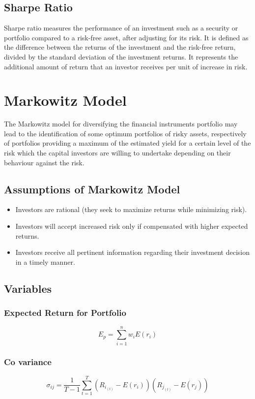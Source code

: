\documentclass[conference]{IEEEtran}
\begin{document}
\subsection{Sharpe Ratio}
    Sharpe ratio measures the performance of an investment such as a security or portfolio compared to a risk-free asset, after adjusting for its risk. It is defined as the difference between the returns of the investment and the risk-free return, divided by the standard deviation of the investment returns. It represents the additional amount of return that an investor receives per unit of increase in risk.
    

\section{Markowitz Model}
The Markowitz model for diversifying the financial instruments portfolio may lead to the identification of some optimum portfolios of risky assets, respectively of portfolios providing a maximum of the estimated yield for a certain level of the risk which the capital investors are willing to undertake depending on their behaviour against the risk.

\subsection{Assumptions of Markowitz Model}
    \begin{itemize}
        \item Investors are rational (they seek to maximize returns while minimizing risk).
        \item Investors will accept increased risk only if compensated with higher expected returns.
        \item Investors receive all pertinent information regarding their investment decision in a timely manner.
    \end{itemize}

\subsection{Variables}
    \subsubsection{Expected Return for Portfolio}
        \[
            E_p = \sum_{i=1}^{n}
            w_i E(r_i)
        \]
    
    \subsubsection{Co variance}
        \[
            \sigma_{ij} = 
            \frac{1}{T-1}
            \sum_{t=1}^{T}
            (R_{i_{(t)}} - E(r_i)) (R_{j_{(t)}} - E(r_j))
        \]
        
\end{document}
